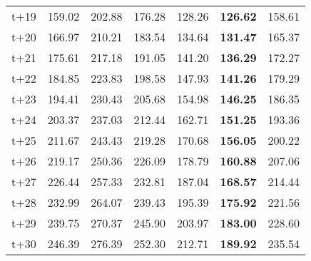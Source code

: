 \begin{table}[H]
\begin{tabular}{lrrrrrr}
t+19  & 159.02  & 202.88  & 176.28  & 128.26  & \textbf{126.62}  & 158.61  \\
t+20  & 166.97  & 210.21  & 183.54  & 134.64  & \textbf{131.47}  & 165.37  \\
t+21  & 175.61  & 217.18  & 191.05  & 141.20  & \textbf{136.29}  & 172.27  \\
t+22  & 184.85  & 223.83  & 198.58  & 147.93  & \textbf{141.26}  & 179.29  \\
t+23  & 194.41  & 230.43  & 205.68  & 154.98  & \textbf{146.25}  & 186.35  \\
t+24  & 203.37  & 237.03  & 212.44  & 162.71  & \textbf{151.25}  & 193.36  \\
t+25  & 211.67  & 243.43  & 219.28  & 170.68  & \textbf{156.05}  & 200.22  \\
t+26  & 219.17  & 250.36  & 226.09  & 178.79  & \textbf{160.88}  & 207.06  \\
t+27  & 226.44  & 257.33  & 232.81  & 187.04  & \textbf{168.57}  & 214.44  \\
t+28  & 232.99  & 264.07  & 239.43  & 195.39  & \textbf{175.92}  & 221.56  \\
t+29  & 239.75  & 270.37  & 245.90  & 203.97  & \textbf{183.00}  & 228.60  \\
t+30  & 246.39  & 276.39  & 252.30  & 212.71  & \textbf{189.92}  & 235.54  \\

\bottomrule
\end{tabular}
\end{table}
